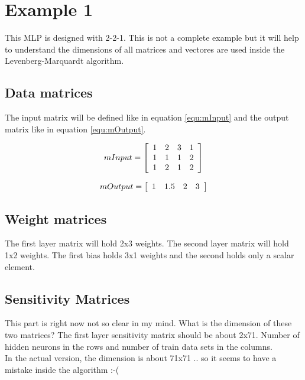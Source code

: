 \section{Example 1}

This MLP is designed with 2-2-1. This is not a complete example but it will help to understand the
dimensions of all matrices and vectores are used inside the Levenberg-Marquardt algorithm.

\subsection{Data matrices}
The input matrix will be defined like in equation \eqref{equ:mInput} and the output matrix like in 
equation \eqref{equ:mOutput}.

\begin{equation}
  mInput = \left[ \begin{array}{c c c c}
												1 & 2 & 3 & 1   \\
												1	& 1 & 1 & 2 	\\
												1 & 2 & 1 & 2		\\																					
												\end{array}
					\right]
		\label{equ:mInput}
\end{equation}

\begin{equation}
  mOutput = \left[ \begin{array}{c c c c}
												1 & 1.5 & 2 & 3   \\																					
									 \end{array}
					\right]
		\label{equ:mOutput}
\end{equation}




\subsection{Weight matrices}
The first layer matrix will hold 2x3 weights. The second layer matrix will hold 1x2 weights.
The first bias holds 3x1 weights and the second holds only a scalar element.

\subsection{Sensitivity Matrices}
This part is right now not so clear in my mind. What is the dimension of these two matrices?
The first layer sensitivity matrix should be about 2x71. Number of hidden neurons in the rows and number of train data sets in the columns.\\

In the actual version, the dimension is about 71x71 .. so it seems to have a mistake inside the algorithm :-(

